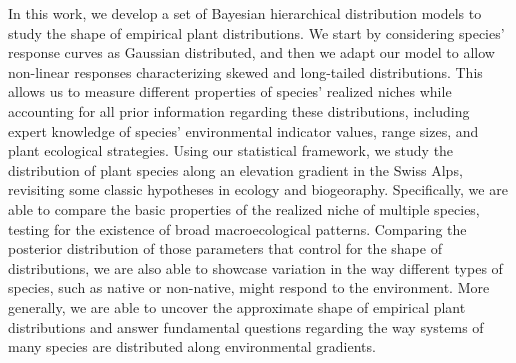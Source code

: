 \documentclass[11pt, a4paper]{article}
\begin{document}
In this work, we develop a set of Bayesian hierarchical distribution models to study the shape of empirical plant distributions. We start by considering species' response curves as Gaussian distributed, and then we adapt our model to allow non-linear responses characterizing skewed and long-tailed distributions. This allows us to measure different properties of species' realized niches while accounting for all prior information regarding these distributions, including expert knowledge of species' environmental indicator values, range sizes, and plant ecological strategies. Using our statistical framework, we study the distribution of plant species along an elevation gradient in the Swiss Alps, revisiting some classic hypotheses in ecology and biogeoraphy. Specifically, we are able to compare the basic properties of the realized niche of multiple species, testing for the existence of broad macroecological patterns. Comparing the posterior distribution of those parameters that control for the shape of distributions, we are also able to showcase variation in the way different types of species, such as native or non-native, might respond to the environment. More generally, we are able to uncover the approximate shape of empirical plant distributions and answer fundamental questions regarding the way systems of many species are distributed along environmental gradients.

\end{document}
